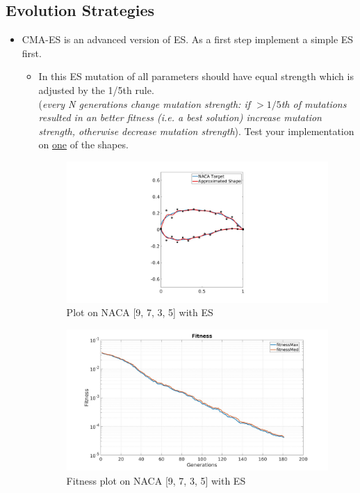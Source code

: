 \documentclass{article}
\begin{document}
\subsection{Evolution Strategies}
\begin{itemize}
	\item CMA-ES is an advanced version of ES. As a first step implement a simple ES first. 
		\begin{itemize}
			\item In this ES mutation of all parameters should have equal strength which is adjusted by the 1/5th rule.\\(\textit{every N generations change mutation strength: if $>1/5$th of mutations resulted in an better fitness (i.e. a best solution) increase mutation strength, otherwise decrease mutation strength}). Test your implementation on \underline{one} of the shapes.
			\begin{figure}[H]
				\centering
				\includegraphics[width=1.0\textwidth]{img/es_foil3_single.jpg}
				\caption{Plot on NACA [9, 7, 3, 5] with ES}
			\end{figure}
			\begin{figure}[H]
				\centering
				\includegraphics[width=1.0\textwidth]{img/es_fitness_foil3_single.jpg}
				\caption{Fitness plot on NACA [9, 7, 3, 5] with ES}
			\end{figure}
			

\end{itemize}
\end{itemize}
\end{document}
